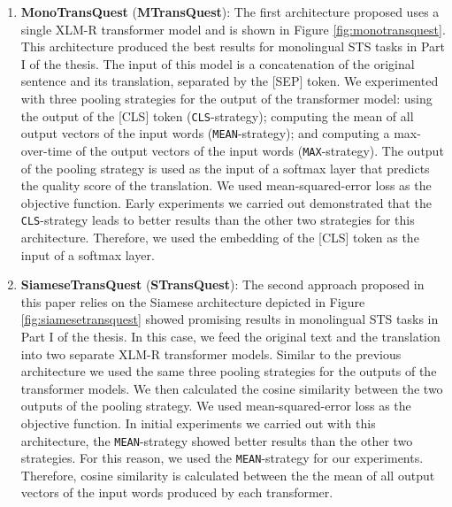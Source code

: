 \begin{enumerate}
	\item \textbf{MonoTransQuest} (\textbf{MTransQuest}): 
	The first architecture proposed uses a single XLM-R transformer model and is shown in Figure \ref{fig:monotransquest}. This architecture produced the best results for monolingual STS tasks in Part I of the thesis. The input of this model is a concatenation of the original sentence and its translation, separated by the \textsc{[SEP]} token. We experimented with three pooling strategies for the output of the transformer model: using the output of the \textsc{[CLS]} token (\texttt{CLS}-strategy); computing the mean of all output vectors of the input words (\texttt{MEAN}-strategy); and computing a max-over-time of the output vectors of the input words (\texttt{MAX}-strategy). The output of the pooling strategy is used as the input of a softmax layer that predicts the quality score of the translation. We used mean-squared-error loss as the objective function. Early experiments we carried out demonstrated that the \texttt{CLS}-strategy leads to better results than the other two strategies for this architecture. Therefore,  we used the embedding of the \textsc{[CLS]} token as the input of a softmax layer.
	
	
	\item \textbf{SiameseTransQuest} (\textbf{STransQuest}): The second approach proposed in this paper relies on the Siamese architecture depicted in Figure \ref{fig:siamesetransquest} showed promising results in monolingual STS tasks \cite{reimers-gurevych-2019-sentence} in Part I of the thesis. In this case, we feed the original text and the translation into two separate XLM-R transformer models. Similar to the previous architecture we used the same three pooling strategies for the outputs of the transformer models. We then calculated the cosine similarity between the two outputs of the pooling strategy. We used mean-squared-error loss as the objective function. In initial experiments we carried out with this architecture, the \texttt{MEAN}-strategy showed better results than the other two strategies. For this reason, we used the \texttt{MEAN}-strategy for our experiments. Therefore, cosine similarity is calculated between the the mean of all output vectors of the input words produced by each transformer. 

	
\end{enumerate}


